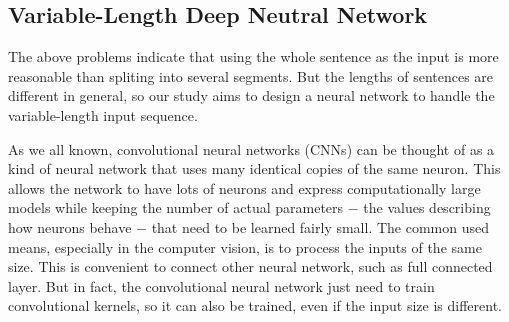 \documentclass[a4paper]{article}
\begin{document}

\subsection{Variable-Length Deep Neutral Network}
\label{ssec:var_len_dnn}

The above problems indicate that using the whole sentence as the input is more reasonable than spliting into several segments. But the lengths of sentences are different in general, so our study aims to design a neural network to handle the variable-length input sequence. 

As we all known, convolutional neural networks (CNNs) can be thought of as a kind of neural network that uses many identical copies of the same neuron. This allows the network to have lots of neurons and express computationally large models while keeping the number of actual parameters $-$ the values describing how neurons behave $-$ that need to be learned fairly small. The common used means, especially in the computer vision, is to process the inputs of the same size. This is convenient to connect other neural network, such as full connected layer. But in fact, the convolutional neural network just need to train convolutional kernels, so it can also be trained, even if the input size is different.
\end{document}
